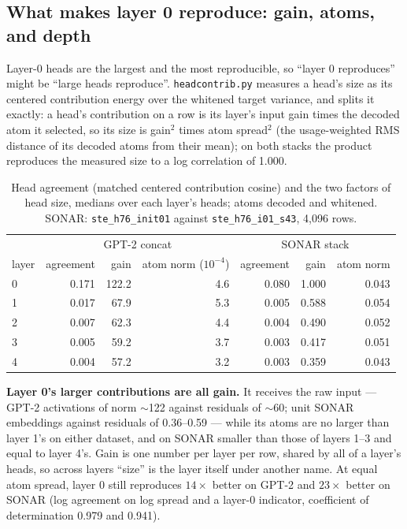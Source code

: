\subsection{What makes layer 0 reproduce: gain, atoms, and depth}
\label{sec:l0size}

Layer-0 heads are the largest and the most reproducible, so ``layer 0
reproduces'' might be ``large heads reproduce''. \texttt{headcontrib.py}
measures a head's size as its centered contribution energy over the
whitened target variance, and splits it exactly: a head's contribution on
a row is its layer's input gain times the decoded atom it selected, so
its size is gain$^2$ times atom spread$^2$ (the usage-weighted RMS
distance of its decoded atoms from their mean); on both stacks the
product reproduces the measured size to a log correlation of 1.000.

\begin{table}[htbp]\centering\small
\begin{tabular}{@{}lrrrrrr@{}}
\toprule
& \multicolumn{3}{c}{GPT-2 concat} & \multicolumn{3}{c}{SONAR stack} \\
layer & agreement & gain & atom norm ($10^{-4}$) & agreement & gain & atom norm \\
\midrule
0 & 0.171 & 122.2 & 4.6 & 0.080 & 1.000 & 0.043 \\
1 & 0.017 & 67.9 & 5.3 & 0.005 & 0.588 & 0.054 \\
2 & 0.007 & 62.3 & 4.4 & 0.004 & 0.490 & 0.052 \\
3 & 0.005 & 59.2 & 3.7 & 0.003 & 0.417 & 0.051 \\
4 & 0.004 & 57.2 & 3.2 & 0.003 & 0.359 & 0.043 \\
\bottomrule
\end{tabular}
\caption{Head agreement (matched centered contribution cosine) and the
two factors of head size, medians over each layer's heads; atoms decoded
and whitened. SONAR: \texttt{ste\_h76\_init01} against
\texttt{ste\_h76\_i01\_s43}, 4{,}096 rows.}
\label{tab:gainatoms}
\end{table}

\textbf{Layer 0's larger contributions are all gain.} It receives the raw
input --- GPT-2 activations of norm $\sim$122 against residuals of
$\sim$60; unit SONAR embeddings against residuals of 0.36--0.59 --- while
its atoms are no larger than layer 1's on either dataset, and on SONAR
smaller than those of layers 1--3 and equal to layer 4's. Gain is one
number per layer per row, shared by all of a layer's heads, so across
layers ``size'' is the layer itself under another name. At equal atom
spread, layer 0 still reproduces $14\times$ better on GPT-2 and $23\times$
better on SONAR (log agreement on log spread and a layer-0 indicator,
coefficient of determination 0.979 and 0.941).

